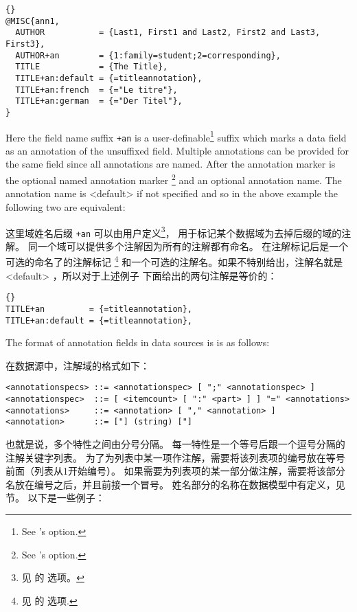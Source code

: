 \begin{lstlisting}[style=bibtex]{}
@MISC{ann1,
  AUTHOR           = {Last1, First1 and Last2, First2 and Last3, First3},
  AUTHOR+an        = {1:family=student;2=corresponding},
  TITLE            = {The Title},
  TITLE+an:default = {=titleannotation},
  TITLE+an:french  = {="Le titre"},
  TITLE+an:german  = {="Der Titel"},
}
\end{lstlisting}
%
Here the field name suffix \texttt{+an} is a user-definable\footnote{See \biber's  option.} suffix which marks a data field as an annotation of the unsuffixed field. Multiple annotations can be provided for the same field since all annotations are named. After the annotation marker is the optional named annotation marker \footnote{See \biber's  option.} and an optional annotation name. The annotation name is <default> if not specified and so in the above example the following two are equivalent:



这里域姓名后缀 \texttt{+an} 可以由用户定义\footnote{
	见 \biber 的  选项。}，
用于标记某个数据域为去掉后缀的域的注解。
同一个域可以提供多个注解因为所有的注解都有命名。
在注解标记后是一个可选的命名了的注解标记
 \footnote{见 \biber 的  选项.}
 和一个可选的注解名。如果不特别给出，注解名就是<default> ，所以对于上述例子
 下面给出的两句注解是等价的：

\begin{lstlisting}[style=bibtex]{}
TITLE+an         = {=titleannotation},
TITLE+an:default = {=titleannotation},
\end{lstlisting}
%
The format of annotation fields in \bibtex data sources is is as follows:


在\bibtex 数据源中，注解域的格式如下：

\begin{lstlisting}
<annotationspecs> ::= <annotationspec> [ ";" <annotationspec> ]
<annotationspec>  ::= [ <itemcount> [ ":" <part> ] ] "=" <annotations>
<annotations>     ::= <annotation> [ "," <annotation> ]
<annotation>      ::= ["] (string) ["]
\end{lstlisting}
%
也就是说，多个特性之间由分号分隔。
每一特性是一个等号后跟一个逗号分隔的注解关键字列表。
为了为列表中某一项作注解，需要将该列表项的编号放在等号前面（列表从1开始编号）。
如果需要为列表项的某一部分做注解，需要将该部分名放在编号之后，并且前接一个冒号。
姓名部分的名称在数据模型中有定义，见  节。
以下是一些例子：

